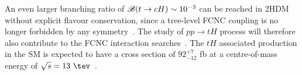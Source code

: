 \documentclass[PAPER, coverpage, atlasdraft=true, texlive=2016, UKenglish]{\ATLASLATEXPATH atlasdoc} %
\begin{document}
An even larger branching ratio of  $\mathscr{B}(t\to cH) \sim 10^{-3}$ can be reached in 2HDM without explicit flavour conservation, since a tree-level FCNC coupling is no longer forbidden by any symmetry~\cite{Cheng:1987rs,Baum:2008qm,Chen:2013qta,Chiang:2015cba,Crivellin:2015hha,Botella:2015hoa, Gori:2017tvg,Chiang:2017fjr}. 
The study of $pp\rightarrow tH$ process will therefore also contribute to the FCNC interaction searches~\cite{Greljo:2014dka}.
The $tH$ associated production in the SM is expected to have a cross section of $92^{+7}_{-12}$ fb at a centre-of-mass energy of $\sqrt{s}= 13~\tev$~\cite{deFlorian:2016spz}.
\end{document}
